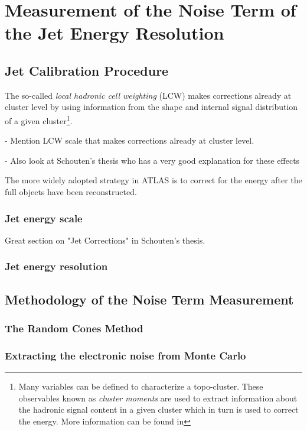 \chapter{Measurement of the Noise Term of the Jet Energy Resolution}
\label{chap:calibration}

\section{Jet Calibration Procedure}
The so-called \emph{local hadronic cell weighting} (LCW) makes corrections already at cluster level by using information from the shape and internal signal distribution of a given cluster\footnote{Many variables can be defined to characterize a topo-cluster. These observables known as \emph{cluster moments} are used to extract information about the hadronic signal content in a given cluster which in turn is used to correct the energy. More information can be found in }.

- Mention LCW scale that makes corrections already at cluster level.

- Also look at Schouten's thesis who has a very good explanation for these effects

The more widely adopted strategy in ATLAS is to correct for the energy after the full objects have been reconstructed.




\subsection{Jet energy scale}
Great section on "Jet Corrections" in Schouten's thesis.

\subsection{Jet energy resolution}

\section{Methodology of the Noise Term Measurement}
\subsection{The Random Cones Method}
\subsection{Extracting the electronic noise from Monte Carlo}
